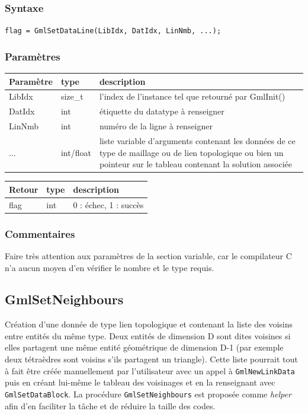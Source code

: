 \documentclass[a4paper,12pt]{article}
\begin{document}
\subsubsection*{Syntaxe}

{\tt flag = GmlSetDataLine(LibIdx, DatIdx, LinNmb, ...);}

\subsubsection*{Paramètres}

\begin{tabular}{|m{2cm}|m{1.5cm}|m{10.5cm}|}
\hline
Paramètre  & type      & description \\
\hline
LibIdx     & size\_t   & l'index de l'instance tel que retourné par GmlInit() \\
\hline
DatIdx     & int       & étiquette du datatype à renseigner \\
\hline
LinNmb     & int       & numéro de la ligne à renseigner \\
\hline
...        & int/float & liste variable d'arguments contenant les données de ce type de maillage ou de lien topologique ou bien un pointeur sur le tableau contenant la solution associée \\
\hline
\end{tabular}

\medskip

\begin{tabular}{|m{2cm}|m{1.5cm}|m{10.5cm}|}
\hline
Retour     & type   & description \\
\hline
flag       & int    & 0 : échec, 1 : succès \\
\hline
\end{tabular}

\subsubsection*{Commentaires}
Faire très attention aux paramètres de la section variable, car le compilateur C n'a aucun moyen d'en vérifier le nombre et le type requis.


\subsection{GmlSetNeighbours}

Création d'une donnée de type lien topologique et contenant la liste des voisins entre entités du même type.
Deux entités de dimension D sont dites voisines si elles partagent une même entité géométrique de dimension D-1 (par exemple deux tétraèdres sont voisins s'ils partagent un triangle).
Cette liste pourrait tout à fait être créée manuellement par l'utilisateur avec un appel à {\tt GmlNewLinkData} puis en créant lui-même le tableau des voisinages et en la renseignant avec {\tt GmlSetDataBlock}.
La procédure {\tt GmlSetNeighbours} est proposée comme \emph{helper} afin d'en faciliter la tâche et de réduire la taille des codes.
\end{document}
